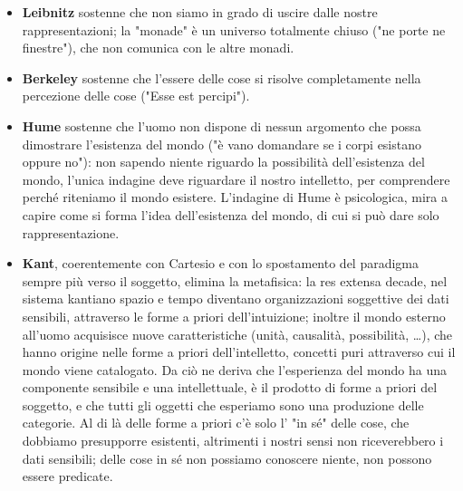 \begin{itemize}
	\item \textbf{Leibnitz} sostenne che non siamo in grado di uscire dalle nostre rappresentazioni; la "monade" è un universo totalmente chiuso ("ne porte ne finestre"), che non comunica con le altre monadi.
	\item \textbf{Berkeley} sostenne che l'essere delle cose si risolve completamente nella percezione delle cose ("Esse est percipi").
	\item \textbf{Hume} sostenne che l'uomo non dispone di nessun argomento che possa dimostrare l'esistenza del mondo ("è vano domandare se i corpi esistano oppure no"): non sapendo niente riguardo la possibilità dell'esistenza del mondo, l'unica indagine deve riguardare il nostro intelletto, per comprendere perché riteniamo il mondo esistere. L'indagine di Hume è psicologica, mira a capire come si forma l'idea dell'esistenza del mondo, di cui si può dare solo rappresentazione.
	\item \textbf{Kant}, coerentemente con Cartesio e con lo spostamento del paradigma sempre più verso il soggetto, elimina la metafisica: la res extensa decade, nel sistema kantiano spazio e tempo diventano organizzazioni soggettive dei dati sensibili, attraverso le forme a priori dell'intuizione; inoltre il mondo esterno all'uomo acquisisce nuove caratteristiche (unità, causalità, possibilità, \dots), che hanno origine nelle forme a priori dell'intelletto, concetti puri attraverso cui il mondo viene catalogato. Da ciò ne deriva che l'esperienza del mondo ha una componente sensibile e una intellettuale, è il prodotto di forme a priori del soggetto, e che tutti gli oggetti che esperiamo sono una produzione delle categorie. Al di là delle forme a priori c'è solo l' "in sé" delle cose, che dobbiamo presupporre esistenti, altrimenti i nostri sensi non riceverebbero i dati sensibili; delle cose in sé non possiamo conoscere niente, non possono essere predicate.
\end{itemize}

